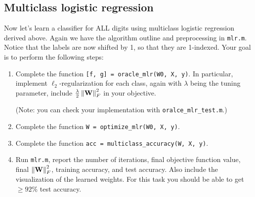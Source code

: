 \subsection{Multiclass logistic regression}

Now let's learn a classifier for ALL digits using multiclass logistic regression derived above. 
Again we have the algorithm outline and preprocessing in {\tt mlr.m}.
Notice that the labels are now shifted by 1, so that they are 1-indexed. 
Your goal is to perform the following steps:


\begin{enumerate}
\item Complete the function {\tt [f, g] = oracle\_mlr(W0, X, y)}. 
In particular, implement $ \ell_2 $-regularization for each class, again with $ \lambda $ being the tuning parameter, \ie include $ \frac{\lambda}{2} \left\| \mathbf{W} \right\|_F^2 $ in your objective. 

(Note: you can check your implementation with {\tt oralce\_mlr\_test.m}.)

\item Complete the function {\tt W = optimize\_mlr(W0, X, y)}.

\item Complete the function {\tt acc = multiclass\_accuracy(W, X, y)}. 

\item Run {\tt mlr.m}, report the number of iterations, final objective function value, final $ \left\| \mathbf{W} \right\|_F^2 $, training accuracy, and test accuracy. 
Also include the visualization of the learned weights. 
For this task you should be able to get $ \ge 92\% $ test accuracy. 

\end{enumerate}

